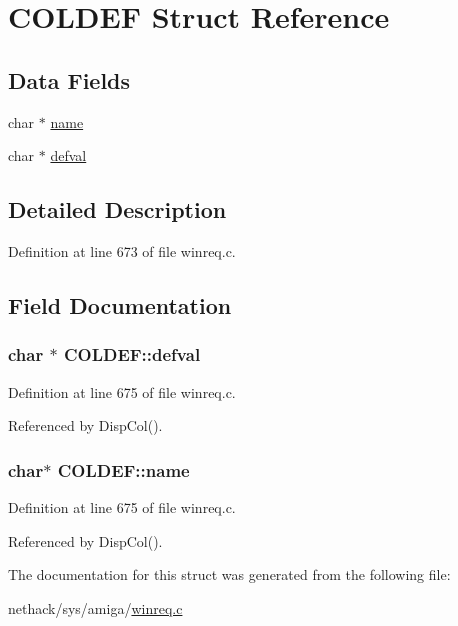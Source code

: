\hypertarget{structCOLDEF}{\section{C\+O\+L\+D\+E\+F Struct Reference}
\label{structCOLDEF}
}
\subsection*{Data Fields}
\begin{DoxyCompactItemize}
\item 
char $\ast$ \hyperlink{structCOLDEF_afc63d0b5e9aa00c71244da9788f0de7f}{name}
\item 
char $\ast$ \hyperlink{structCOLDEF_a43f4bfa44d303497856d5070f75128f0}{defval}
\end{DoxyCompactItemize}


\subsection{Detailed Description}


Definition at line 673 of file winreq.\+c.



\subsection{Field Documentation}
\hypertarget{structCOLDEF_a43f4bfa44d303497856d5070f75128f0}{
\subsubsection[{defval}]{\setlength{\rightskip}{0pt plus 5cm}char $\ast$ C\+O\+L\+D\+E\+F\+::defval}}\label{structCOLDEF_a43f4bfa44d303497856d5070f75128f0}


Definition at line 675 of file winreq.\+c.



Referenced by Disp\+Col().

\hypertarget{structCOLDEF_afc63d0b5e9aa00c71244da9788f0de7f}{
\subsubsection[{name}]{\setlength{\rightskip}{0pt plus 5cm}char$\ast$ C\+O\+L\+D\+E\+F\+::name}}\label{structCOLDEF_afc63d0b5e9aa00c71244da9788f0de7f}


Definition at line 675 of file winreq.\+c.



Referenced by Disp\+Col().



The documentation for this struct was generated from the following file\+:\begin{DoxyCompactItemize}
\item 
nethack/sys/amiga/\hyperlink{winreq_8c}{winreq.\+c}\end{DoxyCompactItemize}
